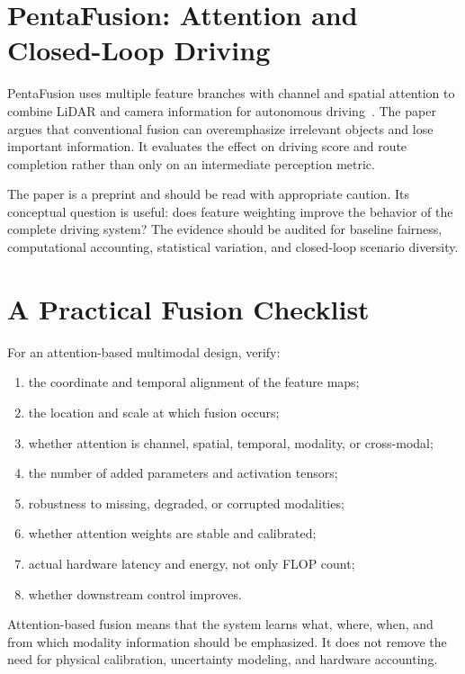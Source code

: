 \section{PentaFusion: Attention and Closed-Loop Driving}

PentaFusion uses multiple feature branches with channel and spatial attention to combine LiDAR and camera information for autonomous driving~\cite{zhang2026pentafusion}. The paper argues that conventional fusion can overemphasize irrelevant objects and lose important information. It evaluates the effect on driving score and route completion rather than only on an intermediate perception metric.

The paper is a preprint and should be read with appropriate caution. Its conceptual question is useful: does feature weighting improve the behavior of the complete driving system? The evidence should be audited for baseline fairness, computational accounting, statistical variation, and closed-loop scenario diversity.

\section{A Practical Fusion Checklist}

For an attention-based multimodal design, verify:

\begin{enumerate}[label=\arabic*.]
    \item the coordinate and temporal alignment of the feature maps;
    \item the location and scale at which fusion occurs;
    \item whether attention is channel, spatial, temporal, modality, or cross-modal;
    \item the number of added parameters and activation tensors;
    \item robustness to missing, degraded, or corrupted modalities;
    \item whether attention weights are stable and calibrated;
    \item actual hardware latency and energy, not only FLOP count;
    \item whether downstream control improves.
\end{enumerate}

\begin{keyinsight}
Attention-based fusion means that the system learns what, where, when, and from which modality information should be emphasized. It does not remove the need for physical calibration, uncertainty modeling, and hardware accounting.
\end{keyinsight}

